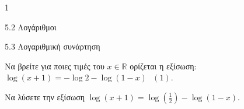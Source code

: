 \begin{ylh}{1}
\item 5.2 Λογάριθμοι
\item 5.3 Λογαριθμική συνάρτηση
\end{ylh}
\begin{alist}
\item Να βρείτε για ποιες τιμές του $x \in {\mathbb{R}}$ ορίζεται η εξίσωση:
$\log(x + 1) = - \log 2 - \log(1 - x)\text{  }(1).$
\item Να λύσετε την εξίσωση $\log(x + 1) = \log\left( \frac{1}{2} \right) - \log(1 - x).$
\end{alist}

